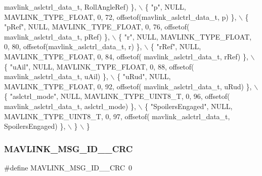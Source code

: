 \begin{DoxyCode}
      mavlink_aslctrl_data_t, RollAngleRef) \}, \(\backslash\)
         \{ \textcolor{stringliteral}{"p"}, NULL, MAVLINK_TYPE_FLOAT, 0, 72, offsetof(mavlink_aslctrl_data_t, p) \}, \(\backslash\)
         \{ \textcolor{stringliteral}{"pRef"}, NULL, MAVLINK_TYPE_FLOAT, 0, 76, offsetof(
      mavlink_aslctrl_data_t, pRef) \}, \(\backslash\)
         \{ \textcolor{stringliteral}{"r"}, NULL, MAVLINK_TYPE_FLOAT, 0, 80, offsetof(mavlink_aslctrl_data_t, r) \}, \(\backslash\)
         \{ \textcolor{stringliteral}{"rRef"}, NULL, MAVLINK_TYPE_FLOAT, 0, 84, offsetof(
      mavlink_aslctrl_data_t, rRef) \}, \(\backslash\)
         \{ \textcolor{stringliteral}{"uAil"}, NULL, MAVLINK_TYPE_FLOAT, 0, 88, offsetof(
      mavlink_aslctrl_data_t, uAil) \}, \(\backslash\)
         \{ \textcolor{stringliteral}{"uRud"}, NULL, MAVLINK_TYPE_FLOAT, 0, 92, offsetof(
      mavlink_aslctrl_data_t, uRud) \}, \(\backslash\)
         \{ \textcolor{stringliteral}{"aslctrl\_mode"}, NULL, MAVLINK_TYPE_UINT8_T, 0, 96, offsetof(
      mavlink_aslctrl_data_t, aslctrl\_mode) \}, \(\backslash\)
         \{ \textcolor{stringliteral}{"SpoilersEngaged"}, NULL, MAVLINK_TYPE_UINT8_T, 0, 97, offsetof(
      mavlink_aslctrl_data_t, SpoilersEngaged) \}, \(\backslash\)
         \} \(\backslash\)
\}
\end{DoxyCode}
\mbox{\label{mavlink__msg__aslctrl__data_8h_ad1db5962383087a4ac189a8061884b98}} 
\subsubsection{M\+A\+V\+L\+I\+N\+K\+\_\+\+M\+S\+G\+\_\+\+I\+D\+\_\+\_\+\+C\+RC}
{\footnotesize\ttfamily \#define M\+A\+V\+L\+I\+N\+K\+\_\+\+M\+S\+G\+\_\+\+I\+D\+\_\+\_\+\+C\+RC~0}

\mbox{\label{mavlink__msg__aslctrl__data_8h_a29a9f9deb9bce7681f44fd712ac22d0b}} 
